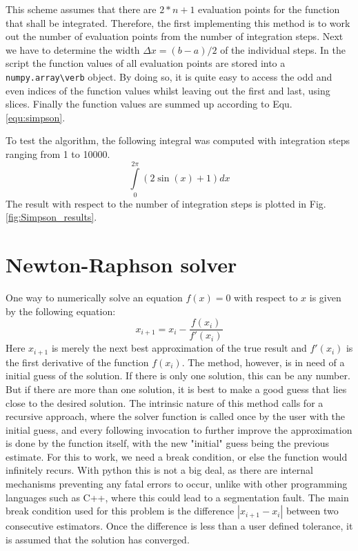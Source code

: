 \documentclass{aa}
\begin{document}
This scheme assumes that there are \(2*n + 1\) evaluation points for the
function that shall be integrated. Therefore, the first implementing this method
is to work out the number of evaluation points from the number of integration
steps. Next we have to determine the width \(\Delta x = (b - a)/2\) of the
individual steps. In the script the function values of all evaluation points are
stored into a \verb+numpy.array\verb+ object. By doing so, it is quite easy to
access the odd and even indices of the function values whilst leaving out the
first and last, using slices. Finally the function values are summed up
according to Equ. \ref{equ:simpson}.

To test the algorithm, the following integral was computed with integration
steps ranging from 1 to 10000.
\begin{equation}
    \label{equ:test_integral}
    \int\limits_0^{2\pi} (2\sin(x) + 1) dx
\end{equation}
The result with respect to the number of integration steps is plotted in Fig.
\ref{fig:Simpson_results}.

\section{Newton-Raphson solver}%
\label{sec:newton_raphson_solver}

One way to numerically solve an equation \(f(x) = 0\) with respect to \(x\) is
given by the following equation:
\begin{equation}
    \label{equ:newton_iterator}
    x_{i+1} = x_i - \frac{f(x_i)}{f'(x_i)}
\end{equation}
Here \(x_{i+1}\) is merely the next best approximation of the true result and
\(f'(x_i)\) is the first derivative of the function \(f(x_i)\). The
method, however, is in need of a initial guess of the solution. If there is only
one solution, this can be any number. But if there are more than one solution,
it is best to make a good guess that lies close to the desired solution. The
intrinsic nature of this method calls for a recursive approach, where the solver
function is called once by the user with the initial guess, and every following
invocation to further improve the approximation is done by the function itself,
with the new "initial" guess being the previous estimate. For this to work, we
need a break condition, or else the function would infinitely recurs. With
python this is not a big deal, as there are internal mechanisms preventing any
fatal errors to occur, unlike with other programming languages such as C++,
where this could lead to a segmentation fault. The main break condition used for
this problem is the difference \(|x_{i+1} - x_i|\) between two consecutive
estimators. Once the difference is less than a user defined tolerance, it is
assumed that the solution has converged.
\end{document}
